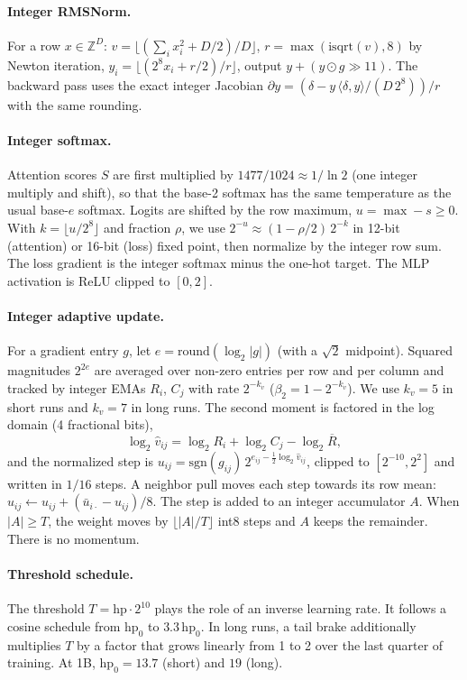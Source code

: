 \documentclass[11pt]{article}
\begin{document}
\paragraph{Integer RMSNorm.} For a row $x\in\mathbb{Z}^D$: $v=\lfloor (\sum_i x_i^2 + D/2)/D\rfloor$, $r=\max(\mathrm{isqrt}(v), 8)$ by Newton iteration, $y_i=\lfloor (2^8 x_i + r/2)/r\rfloor$, output $y + (y\odot g \gg 11)$. The backward pass uses the exact integer Jacobian $\partial y = (\delta - y\,\langle \delta, y\rangle / (D\,2^8))/r$ with the same rounding.

\paragraph{Integer softmax.} Attention scores $S$ are first multiplied by $1477/1024 \approx 1/\ln 2$ (one integer multiply and shift), so that the base-2 softmax has the same temperature as the usual base-$e$ softmax. Logits are shifted by the row maximum, $u = \max - s \ge 0$. With $k=\lfloor u/2^8\rfloor$ and fraction $\rho$, we use $2^{-u} \approx (1 - \rho/2)\,2^{-k}$ in 12-bit (attention) or 16-bit (loss) fixed point, then normalize by the integer row sum. The loss gradient is the integer softmax minus the one-hot target. The MLP activation is ReLU clipped to $[0,2]$.

\paragraph{Integer adaptive update.} For a gradient entry $g$, let $e=\mathrm{round}(\log_2|g|)$ (with a $\sqrt2$ midpoint). Squared magnitudes $2^{2e}$ are averaged over non-zero entries per row and per column and tracked by integer EMAs $R_i$, $C_j$ with rate $2^{-k_v}$ ($\beta_2 = 1-2^{-k_v}$). We use $k_v=5$ in short runs and $k_v=7$ in long runs. The second moment is factored in the log domain (4 fractional bits),
\[\log_2 \hat v_{ij} = \log_2 R_i + \log_2 C_j - \log_2 \overline{R},\]
and the normalized step is $u_{ij} = \mathrm{sgn}(g_{ij})\,2^{e_{ij}-\frac12\log_2 \hat v_{ij}}$, clipped to $[2^{-10},2^{2}]$ and written in $1/16$ steps. A neighbor pull moves each step towards its row mean: $u_{ij} \leftarrow u_{ij} + (\bar u_{i\cdot} - u_{ij})/8$. The step is added to an integer accumulator $A$. When $|A|\ge T$, the weight moves by $\lfloor |A|/T\rfloor$ int8 steps and $A$ keeps the remainder. There is no momentum.

\paragraph{Threshold schedule.} The threshold $T = \mathrm{hp}\cdot 2^{10}$ plays the role of an inverse learning rate. It follows a cosine schedule from $\mathrm{hp}_0$ to $3.3\,\mathrm{hp}_0$. In long runs, a tail brake additionally multiplies $T$ by a factor that grows linearly from 1 to 2 over the last quarter of training. At 1B, $\mathrm{hp}_0 = 13.7$ (short) and $19$ (long).
\end{document}
